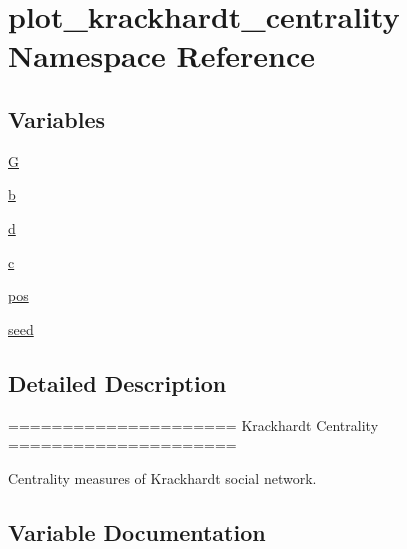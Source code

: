 \hypertarget{namespaceplot__krackhardt__centrality}{}\section{plot\+\_\+krackhardt\+\_\+centrality Namespace Reference}
\label{namespaceplot__krackhardt__centrality}
\subsection*{Variables}
\begin{DoxyCompactItemize}
\item 
\hyperlink{namespaceplot__krackhardt__centrality_a857ff14fca2a827aedc710716034e4cc}{G}
\item 
\hyperlink{namespaceplot__krackhardt__centrality_a55250b8c2c00a8261e95e127ddb56de4}{b}
\item 
\hyperlink{namespaceplot__krackhardt__centrality_aed8979cb405cceed189bba4a912bd148}{d}
\item 
\hyperlink{namespaceplot__krackhardt__centrality_a2a731b639f84661af8139ddf182f8684}{c}
\item 
\hyperlink{namespaceplot__krackhardt__centrality_acc44cc75193a077c11114a38c0fe8f2b}{pos}
\item 
\hyperlink{namespaceplot__krackhardt__centrality_a8285c39f5548f60ee1341fcfc55f3e4a}{seed}
\end{DoxyCompactItemize}


\subsection{Detailed Description}
\begin{DoxyVerb}=====================
Krackhardt Centrality
=====================

Centrality measures of Krackhardt social network.
\end{DoxyVerb}
 

\subsection{Variable Documentation}
\mbox{\label{namespaceplot__krackhardt__centrality_a55250b8c2c00a8261e95e127ddb56de4}} 
